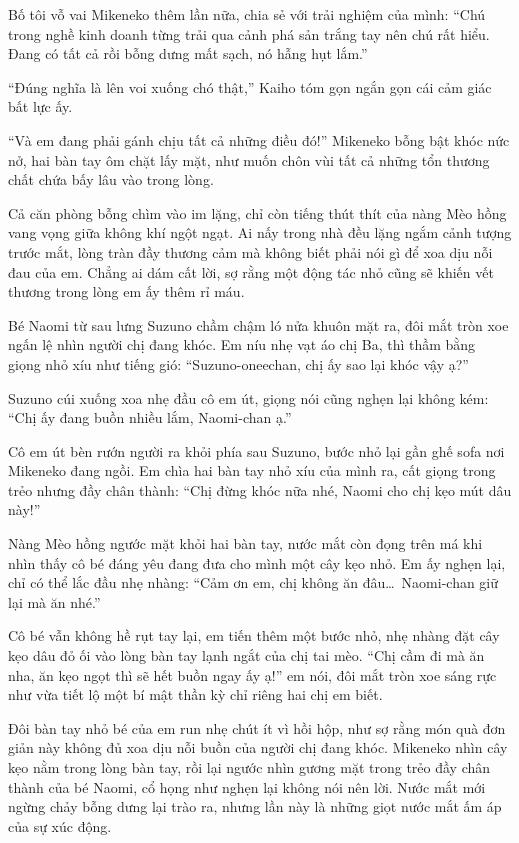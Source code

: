 ﻿\documentclass[../main.tex]{subfiles}
\begin{document}
Bố tôi vỗ vai Mikeneko thêm lần nữa, chia sẻ với trải nghiệm của mình: ``Chú trong nghề kinh doanh từng trải qua cảnh phá sản trắng tay nên chú rất hiểu. Đang có tất cả rồi bỗng dưng mất sạch, nó hẫng hụt lắm.''

``Đúng nghĩa là lên voi xuống chó thật,'' Kaiho tóm gọn ngắn gọn cái cảm giác bất lực ấy.

``Và em đang phải gánh chịu tất cả những điều đó!'' Mikeneko bỗng bật khóc nức nở, hai bàn tay ôm chặt lấy mặt, như muốn chôn vùi tất cả những tổn thương chất chứa bấy lâu vào trong lòng.

Cả căn phòng bỗng chìm vào im lặng, chỉ còn tiếng thút thít của nàng Mèo hồng vang vọng giữa không khí ngột ngạt. Ai nấy trong nhà đều lặng ngắm cảnh tượng trước mắt, lòng tràn đầy thương cảm mà không biết phải nói gì để xoa dịu nỗi đau của em. Chẳng ai dám cất lời, sợ rằng một động tác nhỏ cũng sẽ khiến vết thương trong lòng em ấy thêm rỉ máu.

Bé Naomi từ sau lưng Suzuno chầm chậm ló nửa khuôn mặt ra, đôi mắt tròn xoe ngấn lệ nhìn người chị đang khóc. Em níu nhẹ vạt áo chị Ba, thì thầm bằng giọng nhỏ xíu như tiếng gió: ``Suzuno-oneechan, chị ấy sao lại khóc vậy ạ?''

Suzuno cúi xuống xoa nhẹ đầu cô em út, giọng nói cũng nghẹn lại không kém: ``Chị ấy đang buồn nhiều lắm, Naomi-chan ạ.''

Cô em út bèn rướn người ra khỏi phía sau Suzuno, bước nhỏ lại gần ghế sofa nơi Mikeneko đang ngồi. Em chìa hai bàn tay nhỏ xíu của mình ra, cất giọng trong trẻo nhưng đầy chân thành: ``Chị đừng khóc nữa nhé, Naomi cho chị kẹo mút dâu này!''

Nàng Mèo hồng ngước mặt khỏi hai bàn tay, nước mắt còn đọng trên má khi nhìn thấy cô bé đáng yêu đang đưa cho mình một cây kẹo nhỏ. Em ấy nghẹn lại, chỉ có thể lắc đầu nhẹ nhàng: ``Cảm ơn em, chị không ăn đâu\dots\ Naomi-chan giữ lại mà ăn nhé.''

Cô bé vẫn không hề rụt tay lại, em tiến thêm một bước nhỏ, nhẹ nhàng đặt cây kẹo dâu đỏ ối vào lòng bàn tay lạnh ngắt của chị tai mèo. ``Chị cầm đi mà ăn nha, ăn kẹo ngọt thì sẽ hết buồn ngay ấy ạ!'' em nói, đôi mắt tròn xoe sáng rực như vừa tiết lộ một bí mật thần kỳ chỉ riêng hai chị em biết.

Đôi bàn tay nhỏ bé của em run nhẹ chút ít vì hồi hộp, như sợ rằng món quà đơn giản này không đủ xoa dịu nỗi buồn của người chị đang khóc. Mikeneko nhìn cây kẹo nằm trong lòng bàn tay, rồi lại ngước nhìn gương mặt trong trẻo đầy chân thành của bé Naomi, cổ họng như nghẹn lại không nói nên lời. Nước mắt mới ngừng chảy bỗng dưng lại trào ra, nhưng lần này là những giọt nước mắt ấm áp của sự xúc động.
\end{document}
